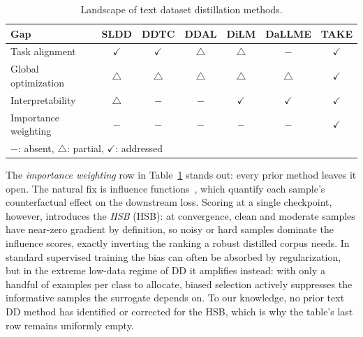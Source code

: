 \documentclass[12pt, a4paper, twoside]{book}
\numberwithin{equation}{chapter}
\theoremstyle{plain}
\theoremstyle{definition}
\theoremstyle{remark}
\newenvironment{foldable}{}{}
\begin{document}
\begin{table}[ht]
  \centering
  \begin{threeparttable}
    \caption{Landscape of text dataset distillation methods.}
    \label{tab:landscape-textdd-methods}
    \setlength{\tabcolsep}{8pt}
    \begin{tabular}{l c c c c c c}
      \toprule
      \textbf{Gap}         & SLDD         & DDTC         & DDAL         & DiLM         & DaLLME       & \textbf{TAKE} \\
      \midrule
      Task alignment       & $\checkmark$ & $\checkmark$ & $\triangle$  & $\triangle$  & $-$          & $\checkmark$ \\
      Global optimization  & $\triangle$  & $\triangle$  & $\triangle$  & $\triangle$  & $\triangle$  & $\checkmark$ \\
      Interpretability     & $\triangle$  & $-$          & $-$          & $\checkmark$ & $\checkmark$ & $\checkmark$ \\
      Importance weighting & $-$          & $-$          & $-$          & $-$          & $-$          & $\checkmark$ \\
      \bottomrule
      \multicolumn{7}{l}{$-$: absent, $\triangle$: partial, $\checkmark$: addressed}
    \end{tabular}
  \end{threeparttable}
\end{table}

\begin{foldable} The \textit{importance weighting} row in Table~\ref{tab:landscape-textdd-methods} stands out: every prior method leaves it open.
  The natural fix is influence functions~\cite{koh2017understanding}, which quantify each sample's counterfactual effect on the downstream loss.
  Scoring at a single checkpoint, however, introduces the \textit{\acl{HSB}} (\ac{HSB}): at convergence, clean and moderate samples have near-zero gradient by definition, so noisy or hard samples dominate the influence scores, exactly inverting the ranking a robust distilled corpus needs.
  In standard supervised training the bias can often be absorbed by regularization, but in the extreme low-data regime of \ac{DD} it amplifies instead: with only a handful of examples per class to allocate, biased selection actively suppresses the informative samples the surrogate depends on.
  To our knowledge, no prior text \ac{DD} method has identified or corrected for the \ac{HSB}, which is why the table's last row remains uniformly empty.
\end{foldable}
\end{document}
